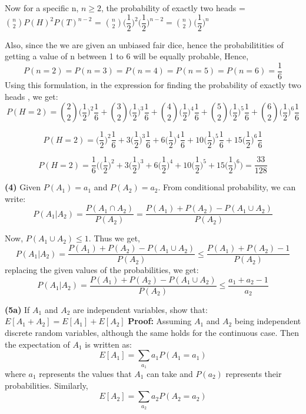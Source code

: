 \documentclass{article}
\renewcommand\part[1]{\vspace{.10in}\textbf{(#1)}}
\begin{document}
  Now for a specific n, $n \geq 2 $, the probability of exactly two heads = $\binom{n}{2} P(H)^2P(T)^{n-2}$ = $\binom{n}{2}\bigg (\dfrac{1}{2} \bigg )^2 \bigg ( \dfrac{1}{2} \bigg)^{n-2} = \binom{n}{2}\bigg ( \dfrac{1}{2} \bigg)^n$

  Also, since the we are given an unbiased fair dice, hence the probabilitities of getting a value of n between 1 to 6 will be equally probable, Hence, \newline
  \[ P(n=2) = P(n=3) = P(n=4) = P(n=5) = P(n=6) = \dfrac{1}{6} \]
  Using this formulation, in the expression for finding the probability of exactly two heads , we get:
  \[P(H=2) = \binom{2}{2}\bigg ( \dfrac{1}{2} \bigg )^2\dfrac{1}{6} + \binom{3}{2}\bigg ( \dfrac{1}{2} \bigg )^3\dfrac{1}{6} + \binom{4}{2}\bigg ( \dfrac{1}{2} \bigg )^4\dfrac{1}{6} + \binom{5}{2}\bigg ( \dfrac{1}{2} \bigg )^5\dfrac{1}{6} + \binom{6}{2}\bigg ( \dfrac{1}{2} \bigg )^6\dfrac{1}{6}\]

  \[P(H=2) = \bigg ( \dfrac{1}{2} \bigg )^2\dfrac{1}{6} + 3\bigg ( \dfrac{1}{2} \bigg )^3\dfrac{1}{6} + 6\bigg ( \dfrac{1}{2} \bigg )^4\dfrac{1}{6} + 10\bigg ( \dfrac{1}{2} \bigg )^5\dfrac{1}{6} + 15\bigg ( \dfrac{1}{2} \bigg )^6\dfrac{1}{6}\]

  \[P(H=2) = \dfrac{1}{6} \bigg (\bigg ( \dfrac{1}{2} \bigg )^2 + 3\bigg ( \dfrac{1}{2} \bigg )^3 + 6\bigg ( \dfrac{1}{2} \bigg )^4 + 10\bigg ( \dfrac{1}{2} \bigg )^5 + 15\bigg ( \dfrac{1}{2} \bigg )^6 \bigg ) = \dfrac{33}{128}\]

  \part{4} 
  Given $P(A_1) = a_1$ and $P(A_2) = a_2$. From conditional probability, we can write: 
  \[P(A_1 | A_2) = \dfrac{P(A_1 \cap A_2)}{P(A_2)} = \dfrac{P(A_1) + P(A_2) - P(A_1 \cup A_2)}{P(A_2)} \]

  Now, $P(A_1 \cup A_2) \leq 1$. Thus we get,
  \[P(A_1 | A_2) = \dfrac{P(A_1) + P(A_2) - P(A_1 \cup A_2)}{P(A_2)} \leq \dfrac{P(A_1) + P(A_2) - 1}{P(A_2)} \]
  replacing the given values of the probabilities, we get: \newline
  \[P(A_1 | A_2) = \dfrac{P(A_1) + P(A_2) - P(A_1 \cup A_2)}{P(A_2)} \leq \dfrac{a_1 + a_2 - 1}{a_2} \]


  \part{5a} If $A_1$ and $A_2$ are independent variables, show that: $E[A_1 + A_2] = E[A_1] + E[A_2]$ \newline
  \textbf{Proof:} Assuming $A_1$ and $A_2$ being independent discrete random variables, although the same holds for the continuous case.
  Then the expectation of $A_1$ is written as:
  \[E[A_1] = \sum_{a_1} a_1P(A_1 = a_1)\]
  where $a_1$ represents the values that $A_1$ can take and $P(a_2)$ represents their probabilities. \newline
  Similarly,
  \[E[A_2] = \sum_{a_2} a_2P(A_2 = a_2) \]
\end{document}

